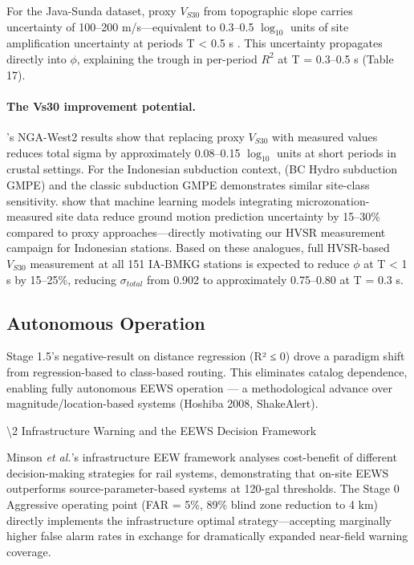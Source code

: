 \documentclass[10pt]{article}
\renewcommand{\cite}[1]{\citep{#1}}
\newcommand{\etal}{\textit{et al.}}
\begin{document}
For the Java-Sunda dataset, proxy \(V_{S30}\) from topographic slope carries uncertainty of 100--200 m/s---equivalent to 0.3--0.5 \(\log_{10}\) units of site amplification uncertainty at periods T \textless{} 0.5 s \cite{ref45}. This uncertainty propagates directly into \(\phi\), explaining the trough in per-period \(R^2\) at T = 0.3--0.5 s (Table 17).

\paragraph{The Vs30 improvement potential.} \citet{ref48}'s NGA-West2 results show that replacing proxy \(V_{S30}\) with measured values reduces total sigma by approximately 0.08--0.15 \(\log_{10}\) units at short periods in crustal settings. For the Indonesian subduction context, \citet{ref61} (BC Hydro subduction GMPE) and the classic \citet{ref63} subduction GMPE demonstrates similar site-class sensitivity. \citet{ref87} show that machine learning models integrating microzonation-measured site data reduce ground motion prediction uncertainty by 15--30\% compared to proxy approaches---directly motivating our HVSR measurement campaign for Indonesian stations. Based on these analogues, full HVSR-based \(V_{S30}\) measurement at all 151 IA-BMKG stations is expected to reduce \(\phi\) at T \textless{} 1 s by 15--25\%, reducing \(\sigma_{total}\) from 0.902 to approximately 0.75--0.80 at T = 0.3 s.

\subsection{Autonomous Operation}

Stage 1.5's negative-result on distance regression (R² ≤ 0) drove a paradigm shift from regression-based to class-based routing. This eliminates catalog dependence, enabling fully autonomous EEWS operation --- a methodological advance over magnitude/location-based systems (Hoshiba 2008, ShakeAlert).

\textbackslash2 Infrastructure Warning and the EEWS Decision Framework

Minson \etal{}'s infrastructure EEW framework \cite{ref11} analyses cost-benefit of different decision-making strategies for rail systems, demonstrating that on-site EEWS outperforms source-parameter-based systems at 120-gal thresholds. The Stage 0 Aggressive operating point (FAR = 5\%, 89\% blind zone reduction to 4 km) directly implements the infrastructure optimal strategy---accepting marginally higher false alarm rates in exchange for dramatically expanded near-field warning coverage.
\end{document}
